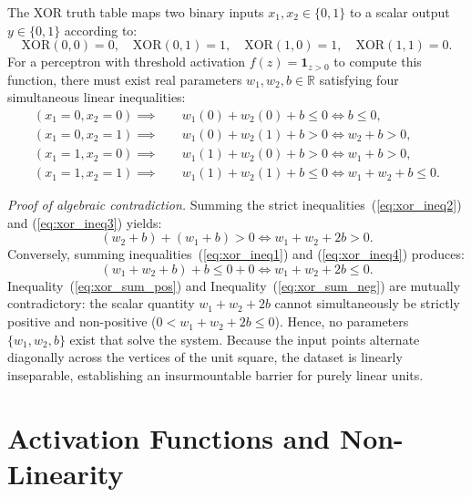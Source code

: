\documentclass[../../main.tex]{subfiles}
\begin{document}
The XOR truth table maps two binary inputs $x_1, x_2 \in \{0, 1\}$ to a scalar output $y \in \{0, 1\}$ according to:
\begin{equation}
\text{XOR}(0, 0) = 0, \quad \text{XOR}(0, 1) = 1, \quad \text{XOR}(1, 0) = 1, \quad \text{XOR}(1, 1) = 0.
\end{equation}
For a perceptron with threshold activation $f(z) = \mathbf{1}_{z > 0}$ to compute this function, there must exist real parameters $w_1, w_2, b \in \mathbb{R}$ satisfying four simultaneous linear inequalities:
\begin{align}
(x_1 = 0, x_2 = 0) \implies & \quad w_1(0) + w_2(0) + b \le 0 \iff b \le 0, \label{eq:xor_ineq1} \\
(x_1 = 0, x_2 = 1) \implies & \quad w_1(0) + w_2(1) + b > 0 \iff w_2 + b > 0, \label{eq:xor_ineq2} \\
(x_1 = 1, x_2 = 0) \implies & \quad w_1(1) + w_2(0) + b > 0 \iff w_1 + b > 0, \label{eq:xor_ineq3} \\
(x_1 = 1, x_2 = 1) \implies & \quad w_1(1) + w_2(1) + b \le 0 \iff w_1 + w_2 + b \le 0. \label{eq:xor_ineq4}
\end{align}

\textit{Proof of algebraic contradiction.} Summing the strict inequalities~(\ref{eq:xor_ineq2}) and (\ref{eq:xor_ineq3}) yields:
\begin{equation}
(w_2 + b) + (w_1 + b) > 0 \iff w_1 + w_2 + 2b > 0.
\label{eq:xor_sum_pos}
\end{equation}
Conversely, summing inequalities~(\ref{eq:xor_ineq1}) and (\ref{eq:xor_ineq4}) produces:
\begin{equation}
(w_1 + w_2 + b) + b \le 0 + 0 \iff w_1 + w_2 + 2b \le 0.
\label{eq:xor_sum_neg}
\end{equation}
Inequality~(\ref{eq:xor_sum_pos}) and Inequality~(\ref{eq:xor_sum_neg}) are mutually contradictory: the scalar quantity $w_1 + w_2 + 2b$ cannot simultaneously be strictly positive and non-positive ($0 < w_1 + w_2 + 2b \le 0$). Hence, no parameters $\{w_1, w_2, b\}$ exist that solve the system. Because the input points alternate diagonally across the vertices of the unit square, the dataset is linearly inseparable, establishing an insurmountable barrier for purely linear units.

\clearpage
\section{Activation Functions and Non-Linearity}
\label{sec:non_linearity_activations}
\end{document}
